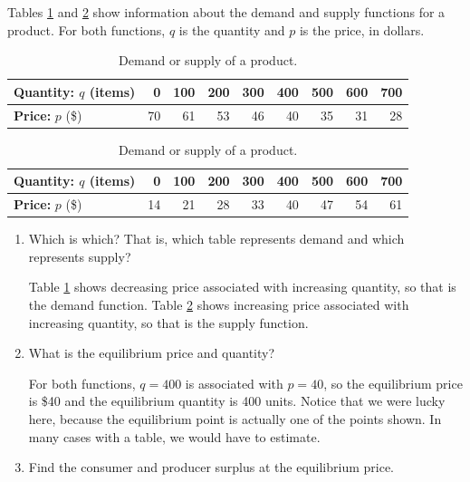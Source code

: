\begin{example}
Tables \ref{tab:5-8-demand} and \ref{tab:5-8-supply} show information about the demand and supply functions for a product. For both functions, $q$ is the quantity and $p$ is the price, in dollars.

\begin{table}[ht!]
    \centering
    \begin{tabular}{l*{8}{r}}
    \toprule
    {\bf Quantity:} $q$ (items) & 0 & 	100	 & 200	 & 300	 & 400	 & 500	 & 600	 & 700\tabularnewline
    \midrule
    {\bf Price:} $p$ (\$) & 70 & 	61 & 	53 & 	46 & 	40 & 	35 & 	31 & 	28\tabularnewline
    \bottomrule
    \end{tabular}
    \caption{Demand or supply of a product.}
    \label{tab:5-8-demand}
\end{table}
\begin{table}[ht!]
    \centering
    \begin{tabular}{l*{8}{r}}
    \toprule
    {\bf Quantity:} $q$ (items) & 0 & 	100	 & 200	 & 300	 & 400	 & 500	 & 600	 & 700\tabularnewline
    \midrule
    {\bf Price:} $p$ (\$)       & 14 & 	21 & 	28 & 	33 & 	40 & 	47 & 	54 & 	61\tabularnewline
    \bottomrule
    \end{tabular}
    \caption{Demand or supply of a product.}
    \label{tab:5-8-supply}
\end{table}
  \begin{enumerate}[label=(\alph*)]
    \item Which is which? That is, which table represents demand and which represents supply?

    \begin{solution}
      Table \ref{tab:5-8-demand} shows decreasing price associated with increasing quantity, so that is the demand function. Table \ref{tab:5-8-supply} shows increasing price associated with increasing quantity, so that is the supply function.
    \end{solution}
    \item What is the equilibrium price and quantity?

    \begin{solution}
For both functions, $q=400$ is associated with $p=40$, so the equilibrium price is \$40 and the equilibrium quantity is 400 units. Notice that we were lucky here, because the equilibrium point is actually one of the points shown. In many cases with a table, we would have to estimate.
    \end{solution}
    \item Find the consumer and producer surplus at the equilibrium price.


\end{enumerate}
\end{example}
